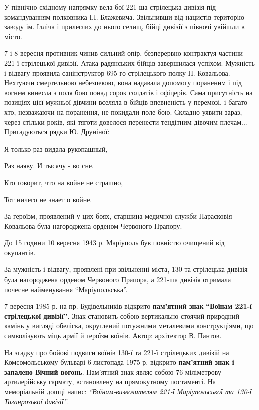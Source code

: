 У північно-східному напрямку вела бої 221-ша стрілецька дивізія під
командуванням полковника І.І. Блажевича. Звільнивши від нацистів територію
заводу ім. Ілліча і прилеглих до нього селищ, бійці дивізії з півночі увійшли в
місто.

7 і 8 вересня противник чинив сильний опір, безперервно контрактуя частини
221-ї стрілецької дивізії. Атака радянських бійців завершилася успіхом.
Мужність і відвагу проявила санінструктор 695-го стрілецького полку П.
Ковальова. Нехтуючи смертельною небезпекою, вона надавала допомогу пораненим і
під вогнем винесла з поля бою понад сорок солдатів і офіцерів. Сама присутність
на позиціях цієї мужньої дівчини вселяла в бійців впевненість у перемозі, і
багато хто, незважаючи на поранення, не покидали поле бою. Складно уявити
зараз, через стільки років, які тяготи довелося перенести тендітним дівочим
плечам... Пригадуються рядки Ю. Друніної:

\begin{center}
\em\bfseries

Я только раз видала рукопашный,

Раз наяву. И тысячу - во сне.

Кто говорит, что на войне не страшно,

Тот ничего не знает о войне.	
\end{center}

За героїзм, проявлений у цих боях, старшина медичної служби Парасковія
Ковальова була нагороджена орденом Червоного Прапору.

До 15 години 10 вересня 1943 р. Маріуполь був повністю очищений від окупантів.

За мужність і відвагу, проявлені при звільненні міста, 130-та стрілецька
дивізія була нагороджена орденом Червоного Прапора, а 221-ша дивізія отримала
почесне найменування \enquote{Маріупольська}.


7 вересня 1985 р. на пр. Будівельників відкрито \textbf{пам'ятний знак} \textbf{\enquote{Воїнам 221-ї
стрілецької дивізії}}. Знак становить собою вертикально стоячий природний камінь
у вигляді обеліска, округлений потужними металевими конструкціями, що
символізують міць армії й героїзм воїнів. Автор: архітектор В. Пантов.

На згадку про бойові подвиги воїнів 130-ї та 221-ї стрілецьких дивізій на
Комсомольському бульварі 6 листопада 1975 р. відкрито \textbf{пам'ятний знак і запалено
Вічний вогонь}. Пам'ятний знак являє собою 76-міліметрову артилерійську гармату,
встановлену на прямокутному постаменті. На меморіальній дошці напис:
\emph{\enquote{Воїнам-визволителям 221-ї Маріупольської та 130-ї Таганрозької дивізії}}.

